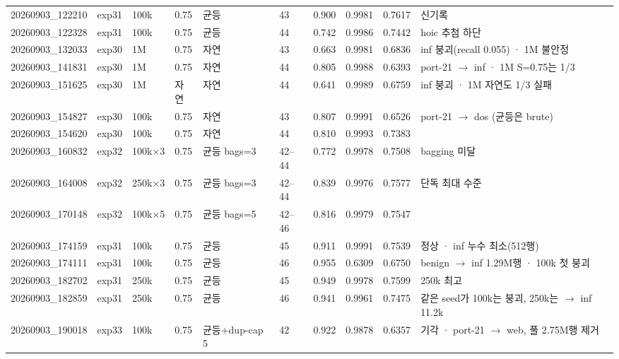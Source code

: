 \begin{landscape}
\begin{longtable}
{}20260903\_\allowbreak{}122210 & exp31 & 100k & 0.75 & 균등 & 43 & 0.900 & 0.9981 & 0.7617 & 신기록 \\
{}20260903\_\allowbreak{}122328 & exp31 & 100k & 0.75 & 균등 & 44 & 0.742 & 0.9986 & 0.7442 & hoic 추첨 하단 \\
{}20260903\_\allowbreak{}132033 & exp30 & 1M & 0.75 & 자연 & 43 & 0.663 & 0.9981 & 0.6836 & inf 붕괴(recall 0.055) · 1M 불안정 \\
{}20260903\_\allowbreak{}141831 & exp30 & 1M & 0.75 & 자연 & 44 & 0.805 & 0.9988 & 0.6393 & port-21 \ensuremath{\rightarrow} inf · 1M S=\allowbreak{}0.75는 1/\allowbreak{}3 \\
{}20260903\_\allowbreak{}151625 & exp30 & 1M & 자연 & 자연 & 44 & 0.641 & 0.9989 & 0.6759 & inf 붕괴 · 1M 자연도 1/\allowbreak{}3 실패 \\
{}20260903\_\allowbreak{}154827 & exp30 & 100k & 0.75 & 자연 & 43 & 0.807 & 0.9991 & 0.6526 & port-21 \ensuremath{\rightarrow} dos (균등은 brute) \\
{}20260903\_\allowbreak{}154620 & exp30 & 100k & 0.75 & 자연 & 44 & 0.810 & 0.9993 & 0.7383 &  \\
{}20260903\_\allowbreak{}160832 & exp32 & 100k×3 & 0.75 & 균등 bags=\allowbreak{}3 & 42–44 & 0.772 & 0.9978 & 0.7508 & bagging 미달 \\
{}20260903\_\allowbreak{}164008 & exp32 & 250k×3 & 0.75 & 균등 bags=\allowbreak{}3 & 42–44 & 0.839 & 0.9976 & 0.7577 & 단독 최대 수준 \\
{}20260903\_\allowbreak{}170148 & exp32 & 100k×5 & 0.75 & 균등 bags=\allowbreak{}5 & 42–46 & 0.816 & 0.9979 & 0.7547 &  \\
{}20260903\_\allowbreak{}174159 & exp31 & 100k & 0.75 & 균등 & 45 & 0.911 & 0.9991 & 0.7539 & 정상 · inf 누수 최소(512행) \\
{}20260903\_\allowbreak{}174111 & exp31 & 100k & 0.75 & 균등 & 46 & 0.955 & 0.6309 & 0.6750 & benign \ensuremath{\rightarrow} inf 1.29M행 · 100k 첫 붕괴 \\
{}20260903\_\allowbreak{}182702 & exp31 & 250k & 0.75 & 균등 & 45 & 0.949 & 0.9978 & 0.7599 & 250k 최고 \\
{}20260903\_\allowbreak{}182859 & exp31 & 250k & 0.75 & 균등 & 46 & 0.941 & 0.9961 & 0.7475 & 같은 seed가 100k는 붕괴, 250k는  \ensuremath{\rightarrow} inf 11.2k \\
{}20260903\_\allowbreak{}190018 & exp33 & 100k & 0.75 & 균등+\allowbreak{}dup-cap 5 & 42 & 0.922 & 0.9878 & 0.6357 & 기각 · port-21 \ensuremath{\rightarrow} web, 풀 2.75M행 제거 \\

\end{longtable}
\end{landscape}

